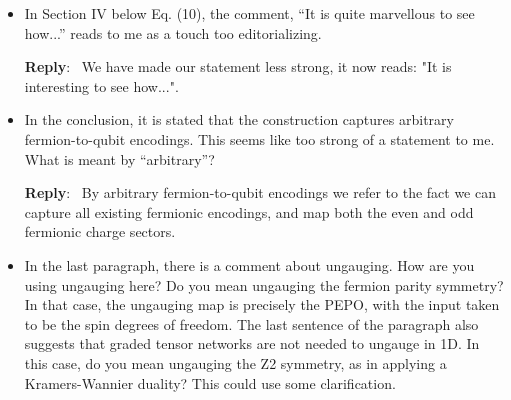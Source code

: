 \documentclass[aps,prx,floatfix,10pt,amssymb,amsfont,amsmath,superscriptaddress,float,nofootinbib,longbibliography,nobalancelastpage]{revtex4-2}
\newenvironment{reply}
   {\medskip \noindent \begin{sf}\textbf{Reply}:\ \color{blue}  }
   {\medskip \end{sf}}
\begin{document}
\begin{itemize}
\begin{reply}
    We thank the referee for pointing out this paragraph is hard to follow. The current explanation of topological sectors is: "These sectors are characterised by the charge sector under the global symmetries of each side, and the twists required for translational symmetries." The following two paragraphs then include examples designed to help explain what these twists and charge sectors are. 

    We have added the following two sentences to define these terms before jumping straight into the examples: "Charge sectors are the eigenspaces of a symmetry operator. Twists are the modifications required to either side of a PEPO upon translation in order to recover the same PEPO."
\end{reply}

\item In Section IV below Eq. (10), the comment, “It is quite marvellous to see how...” reads to me as a touch too editorializing.

\begin{reply}
    We have made our statement less strong, it now reads: "It is interesting to see how...".
\end{reply}

\item In the conclusion, it is stated that the construction captures arbitrary fermion-to-qubit encodings. This seems like too strong of a statement to me. What is meant by “arbitrary”?

\begin{reply}
    By arbitrary fermion-to-qubit encodings we refer to the fact we can capture all existing fermionic encodings, and map both the even and odd fermionic charge sectors.
\end{reply}

\item In the last paragraph, there is a comment about ungauging. How are you using ungauging here? Do you mean ungauging the fermion parity symmetry? In that case, the ungauging map is precisely the PEPO, with the input taken to be the spin degrees of freedom. The last sentence of the paragraph also suggests that graded tensor networks are not needed to ungauge in 1D. In this case, do you mean ungauging the Z2 symmetry, as in applying a Kramers-Wannier duality? This could use some clarification.


\end{itemize}
\end{document}
